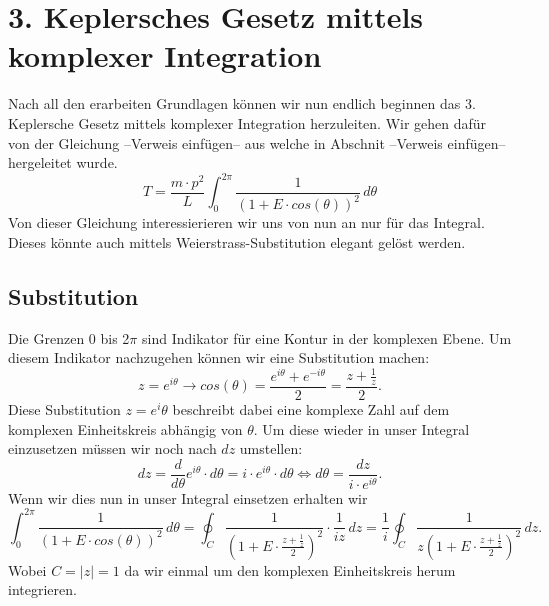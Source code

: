 %
%
%
%
\section{3. Keplersches Gesetz mittels komplexer Integration}
Nach all den erarbeiten Grundlagen können wir nun endlich beginnen das 3. Keplersche Gesetz mittels komplexer Integration herzuleiten.
Wir gehen dafür von der Gleichung --Verweis einfügen-- aus welche in Abschnit --Verweis einfügen-- hergeleitet wurde. 
\[
T
=
\frac{m \cdot p^2}{L} \int_{0}^{2\pi} \frac{1}{(1+E \cdot cos(\theta))^2}\,d\theta
\]
Von dieser Gleichung interessierieren wir uns von nun an nur für das Integral.
Dieses könnte auch mittels Weierstrass-Substitution elegant gelöst werden.
\subsection{Substitution}
Die Grenzen 0 bis 2$\pi$ sind Indikator für eine Kontur in der komplexen Ebene.
Um diesem Indikator nachzugehen können wir eine Substitution machen:
\[
z
=
e^{i\theta}
\longrightarrow
cos(\theta)
=
\frac{e^{i\theta}+e^{-i\theta}}{2}
=
\frac{z+\frac{1}{z}}{2}
.
\]
Diese Substitution $z=e^i\theta$ beschreibt dabei eine komplexe Zahl auf dem komplexen Einheitskreis abhängig von $\theta$.
Um diese wieder in unser Integral einzusetzen müssen wir noch nach $dz$ umstellen:
\[
dz
=
\frac{d}{d\theta}e^{i\theta}\cdot d\theta
=
i \cdot e^{i\theta}\cdot d\theta
\Leftrightarrow
d\theta
=
\frac{dz}{i \cdot e^{i\theta}}
.
\]
Wenn wir dies nun in unser Integral einsetzen erhalten wir
\[
\int_{0}^{2\pi} \frac{1}{(1+E \cdot cos(\theta))^2}\,d\theta
=
\oint_C \frac{1}{(1+E \cdot \frac{z+\frac{1}{z}}{2})^2} \cdot \frac{1}{iz}\,dz
=
\frac{1}{i} \oint_C \frac{1}{z(1+E \cdot \frac{z+\frac{1}{z}}{2})^2}\,dz.
\]
Wobei $C = \left\lvert z\right\rvert = 1$ da wir einmal um den komplexen Einheitskreis herum integrieren.
